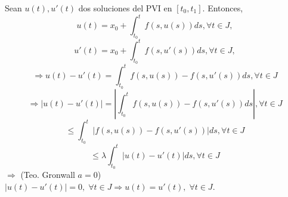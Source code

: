 \begin{dem}
  Sean $u(t), u'(t)$ dos soluciones del PVI en $[t_{0}, t_{1}]$. Entonces,
  \[ 
    u(t) = x_{0} + \int_{t_{0}}^{t} f(s, u(s)) ds, \forall t \in J,
  \] 
  \[ 
    u'(t) = x_{0} + \int_{t_{0}}^{t} f(s, u'(s)) ds, \forall t \in J,
  \] 
  \[ 
    \Rightarrow u(t) - u'(t) = \int_{t_{0}}^{t} f(s, u(s)) - f(s, u'(s)) ds, \forall t \in J
  \] 
  \[ 
    \Rightarrow | u(t) - u'(t) | = | \int_{t_{0}}^{t} f(s, u(s)) - f(s, u'(s)) ds |, \forall t \in J
 
  \] 
  \[ 
    \leq \int_{t_{0}}^{t} | f(s, u(s)) - f(s, u'(s)) | ds, \forall t \in J
  \] 
  \[ 
    \leq  \lambda \int_{t_{0}}^{t} | u(t) - u'(t) | ds, \forall t \in J
  \] 
  $\Rightarrow $ (Teo. Gronwall $a = 0$) $ | u(t) - u'(t) | = 0, \; \forall t \in J \Rightarrow u(t) = u'(t), \; \forall t \in J$.
\end{dem}

